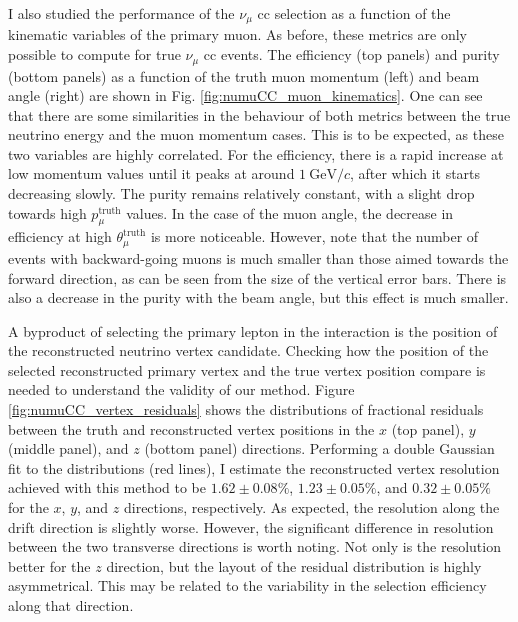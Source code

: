 I also studied the performance of the $\nu_{\mu}$ \gls{cc} selection as a function of the kinematic variables of the primary muon. As before, these metrics are only possible to compute for true $\nu_{\mu}$ \gls{cc} events. The efficiency (top panels) and purity (bottom panels) as a function of the truth muon momentum (left) and beam angle (right) are shown in Fig. \ref{fig:numuCC_muon_kinematics}. One can see that there are some similarities in the behaviour of both metrics between the true neutrino energy and the muon momentum cases. This is to be expected, as these two variables are highly correlated. For the efficiency, there is a rapid increase at low momentum values until it peaks at around $1~\mathrm{GeV}/c$, after which it starts decreasing slowly. The purity remains relatively constant, with a slight drop towards high $p_{\mu}^{\mathrm{truth}}$ values. In the case of the muon angle, the decrease in efficiency at high $\theta_{\mu}^{\mathrm{truth}}$ is more noticeable. However, note that the number of events with backward-going muons is much smaller than those aimed towards the forward direction, as can be seen from the size of the vertical error bars. There is also a decrease in the purity with the beam angle, but this effect is much smaller.

A byproduct of selecting the primary lepton in the interaction is the position of the reconstructed neutrino vertex candidate. Checking how the position of the selected reconstructed primary vertex and the true vertex position compare is needed to understand the validity of our method. Figure \ref{fig:numuCC_vertex_residuals} shows the distributions of fractional residuals between the truth and reconstructed vertex positions in the $x$ (top panel), $y$ (middle panel), and $z$ (bottom panel) directions. Performing a double Gaussian fit to the distributions (red lines), I estimate the reconstructed vertex resolution achieved with this method to be $1.62 \pm 0.08 \%$, $1.23 \pm 0.05 \%$, and $0.32 \pm 0.05 \%$ for the $x$, $y$, and $z$ directions, respectively. As expected, the resolution along the drift direction is slightly worse. However, the significant difference in resolution between the two transverse directions is worth noting. Not only is the resolution better for the $z$ direction, but the layout of the residual distribution is highly asymmetrical. This may be related to the variability in the selection efficiency along that direction.

